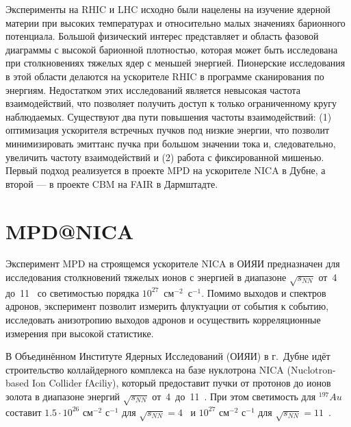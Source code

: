 Эксперименты на RHIC и LHC исходно были нацелены на изучение ядерной материи при высоких температурах и относительно малых значениях барионного потенциала. Большой физический интерес представляет и область фазовой диаграммы с высокой барионной плотностью, которая может быть исследована при столкновениях тяжелых ядер с меньшей энергией. Пионерские исследования в этой области делаются на ускорителе RHIC в программе сканирования по энергиям. Недостатком этих исследований является невысокая частота взаимодействий, что позволяет получить доступ к только ограниченному кругу наблюдаемых. Существуют два пути повышения частоты взаимодействий: (1) оптимизация ускорителя встречных пучков под низкие энергии, что позволит минимизировать эмиттанс пучка при большом значении тока и, следовательно, увеличить частоту взаимодействий и (2) работа с фиксированной мишенью. Первый подход реализуется в проекте MPD на ускорителе NICA в Дубне, а второй --- в проекте CBM на FAIR в Дармштадте.


\section{MPD@NICA}

Эксперимент MPD на строящемся ускорителе NICA в ОИЯИ предназначен для исследования столкновений тяжелых ионов с энергией в диапазоне $\sqrt{s_{NN}}$ от~4 до~11~\GeVperNucl{} со светимостью порядка $10^{27}$~см$^{-2}$~с$^{-1}$. Помимо выходов и спектров адронов, эксперимент позволит измерить флуктуации от события к событию, исследовать анизотропию выходов адронов и осуществить корреляционные измерения при высокой статистике.


В Объединённом Институте Ядерных Исследований (ОИЯИ) в г.~Дубне идёт строительство коллайдерного комплекса на базе нуклотрона NICA (Nuclotron-based Ion Collider fAciliy), который предоставит пучки от протонов до ионов золота в диапазоне энергий $\sqrt{s_{NN}}$ от~4~до~11~\GeVperNucl{}. При этом светимость для $^{197}Au$ составит $1.5 \cdot 10^{26}$ см$^{-2}$ с$^{-1}$ для $\sqrt{s_{NN}}=4$~\GeVperNucl{} и $10^{27}$ см$^{-2}$ с$^{-1}$ для $\sqrt{s_{NN}}=11$~\GeVperNucl{}.




